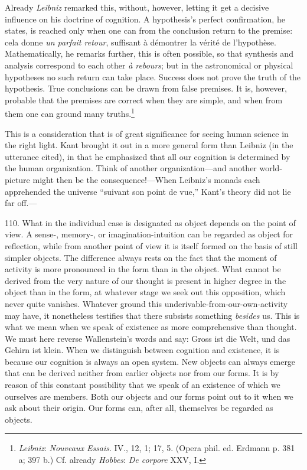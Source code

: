 \documentclass[12pt,a4paper]{book}
\newcommand{\opage}[1]{\marginnote{\footnotesize\textit{[#1]}}}
\begin{document}
Already \emph{Leibniz} remarked this, without, however, letting it get a
decisive influence on his doctrine of cognition. A hypothesis's perfect
confirmation, he states, is reached only when one can from the conclusion
return to the premise: cela donne \emph{un parfait retour}, suffisant à
démontrer la vérité de l'hypothèse. Mathematically, he remarks further, this
is often possible, so that synthesis and analysis correspond to each other
\emph{à rebours}; but in the astronomical or physical hypotheses no such
return can take place. Success does not prove the truth of the hypothesis. True
conclusions can be drawn from false premises. It is, however, probable that
the premises are correct when they are simple, and when from them one can
ground many truths.\footnote{\emph{Leibniz}: \emph{Nouveaux Essais}. IV., 12,
1; 17, 5. (Opera phil. ed. Erdmann p. 381 a; 397 b.) Cf. already
\emph{Hobbes}: \emph{De corpore} XXV, I.}

This is a consideration that is of great significance for \opage{262}seeing human science
in the right light. Kant brought it out in a more general form than Leibniz (in
the utterance cited), in that he emphasized that all our cognition is
determined by the human organization. Think of another organization---and
another world-picture might then be the consequence!---When Leibniz's monads
each apprehended the universe ``suivant son point de vue,'' Kant's theory did
not lie far off.---

110. What in the individual case is designated as object depends on the point
of view. A sense-, memory-, or imagination-intuition can be regarded as object
for reflection, while from another point of view it is itself formed on the
basis of still simpler objects. The difference always rests on the fact that
the moment of activity is more pronounced in the form than in the object. What
cannot be derived from the very nature of our thought is present in higher
degree in the object than in the form, at whatever stage we seek out this
opposition, which never quite vanishes. Whatever ground this underivable-from-our-own-activity
may have, it nonetheless testifies that there subsists something \emph{besides}
us. This is what we mean when we speak of existence as more comprehensive than
thought. We must here reverse Wallenstein's words and say: Gross ist die Welt,
und das Gehirn ist klein. When we distinguish between cognition and existence,
it is because our cognition is always an open system. New objects can always
emerge that can be derived neither from earlier objects nor from our forms. It
is by reason of this constant possibility that we speak of an existence of
which we ourselves are members. Both our objects and our forms point out to it
when we ask about their origin. Our forms can, after all, themselves be
regarded as objects.
\end{document}
